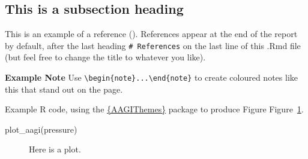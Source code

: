 \documentclass[
]{article}
\newenvironment{Shaded}{\begin{snugshade}}{\end{snugshade}}
\newcommand{\FunctionTok}[1]{\textcolor[rgb]{0.28,0.35,0.67}{#1}}
\newcommand{\NormalTok}[1]{\textcolor[rgb]{0.00,0.23,0.31}{#1}}
\begin{document}
\subsection{This is a subsection
heading}\label{this-is-a-subsection-heading}

This is an example of a reference ().
References appear at the end of the report by default, after the last
heading \texttt{\#\ References} on the last line of this .Rmd file (but
feel free to change the title to whatever you like).

\begin{note}
  {\bf\color{aagiteal!75!black} Example Note}\quad
  Use \verb|\begin{note}...\end{note}| to create coloured notes like this
  that stand out on the page.
\end{note}

Example R code, using the
\href{https://aagi-aus.github.io/AAGIThemes/}{\{AAGIThemes\}} package to
produce Figure Figure~\ref{fig-example1}.

\begin{Shaded}
\begin{Highlighting}[]
\FunctionTok{plot\_aagi}\NormalTok{(pressure)}
\end{Highlighting}
\end{Shaded}

\begin{figure}[H]


\caption{\label{fig-example1}Here is a plot.}

\end{figure}%
\end{document}
